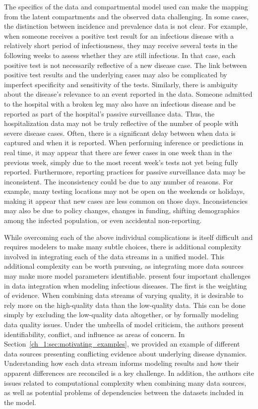 The specifics of the data and compartmental model used can make the mapping from the latent compartments and the observed data challenging.
In some cases, the distinction between incidence and prevalence data is not clear.
For example, when someone receives a positive test result for an infectious disease with a relatively short period of infectiousness, they may receive several tests in the following weeks to assess whether they are still infectious.
In that case, each positive test is not necessarily reflective of a new disease case.
The link between positive test results and the underlying cases may also be complicated by imperfect specificity and sensitivity of the tests.
Similarly, there is ambiguity about the disease's relevance to an event reported in the data.
Someone admitted to the hospital with a broken leg may also have an infectious disease and be reported as part of the hospital's passive surveillance data.
Thus, the hospitalization data may not be truly reflective of the number of people with severe disease cases.
Often, there is a significant delay between when data is captured and when it is reported.
When performing inference or predictions in real time, it may appear that there are fewer cases in one week than in the previous week, simply due to the most recent week's tests not yet being fully reported.
Furthermore, reporting practices for passive surveillance data may be inconsistent.
The inconsistency could be due to any number of reasons.
For example, many testing locations may not be open on the weekends or holidays, making it appear that new cases are less common on those days.
Inconsistencies may also be due to policy changes, changes in funding, shifting demographics among the infected population, or even accidental non-reporting.

While overcoming each of the above individual complications is itself difficult and requires modelers to make many subtle choices, there is additional complexity involved in integrating each of the data streams in a unified model.
This additional complexity can be worth pursuing, as integrating more data sources may make more model parameters identifiable.
\citet{DeAngelis2015four} present four important challenges in data integration when modeling infectious diseases.
The first is the weighting of evidence.
When combining data streams of varying quality, it is desirable to rely more on the high-quality data than the low-quality data.
This can be done simply by excluding the low-quality data altogether, or by formally modeling data quality issues.
Under the umbrella of model criticism, the authors present identifiability, conflict, and influence as areas of concern.
In Section~\ref{ch_1:sec:motivating_examples}, we provided an example of different data sources presenting conflicting evidence about underlying disease dynamics.
Understanding how each data stream informs modeling results and how their apparent differences are reconciled is a key challenge.
In addition, the authors cite issues related to computational complexity when combining many data sources, as well as potential problems of dependencies between the datasets included in the model.


